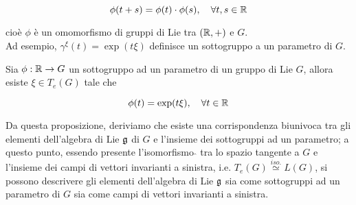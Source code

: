 \begin{equation}
	\phi(t+s) = \phi(t) \cdot \phi(s) \qcomma \forall t,s \in \R
\end{equation}

cioè $ \phi $ è un omomorfismo di gruppi di Lie tra $ (\mathbb{R},+) $ e $ G $.\\
Ad esempio, $ \gamma^{\xi}(t) = \exp(t \xi) $ definisce un sottogruppo a un parametro di $ G $.

\begin{definition}
	Sia $ \phi : \mathbb{R} \to G $ un sottogruppo ad un parametro di un gruppo di Lie $ G $, allora esiste $ \xi \in T_{e}(G) $ tale che
	
	\begin{equation}
		\phi(t) = \exp (t \xi) \qcomma \forall t \in \R
	\end{equation}
\end{definition}

\begin{remark}
	Da questa proposizione, deriviamo che esiste una corrispondenza biunivoca tra gli elementi dell'algebra di Lie $ \mathfrak{g} $ di $ G $ e l'insieme dei sottogruppi ad un parametro; a questo punto, essendo presente l'isomorfismo $ \hat{} $ tra lo spazio tangente a $ G $ e l'insieme dei campi di vettori invarianti a sinistra, i.e. $ T_{e}(G) \stackrel{iso.}{\simeq} L(G) $, si possono descrivere gli elementi dell'algebra di Lie $ \mathfrak{g} $ sia come sottogruppi ad un parametro di $ G $ sia come campi di vettori invarianti a sinistra.
\end{remark}

